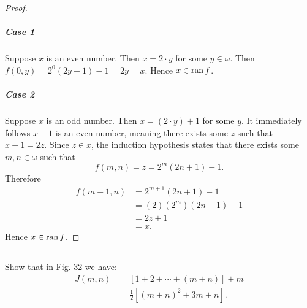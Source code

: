 \documentclass{report}
\begin{document}
\begin{proof}
      \subparagraph{Case 1}%

        Suppose $x$ is an even number.
        Then $x = 2 \cdot y$ for some $y \in \omega$.
        Then $f(0, y) = 2^0(2y + 1) - 1 = 2y = x$.
        Hence $x \in \mathop{\text{ran}}{f}$.

      \subparagraph{Case 2}%

        Suppose $x$ is an odd number.
        Then $x = (2 \cdot y) + 1$ for some $y$.
        It immediately follows $x - 1$ is an even number, meaning there exists
          some $z$ such that $x - 1 = 2z$.
        Since $z \in x$, the induction hypothesis states that there exists
          some $m, n \in \omega$ such that $$f(m, n) = z = 2^m(2n + 1) - 1.$$
        Therefore
          \begin{align*}
            f(m + 1, n)
              & = 2^{m+1}(2n + 1) - 1 \\
              & = (2)(2^m)(2n + 1) - 1 \\
              & = 2z + 1 \\
              & = x.
          \end{align*}
        Hence $x \in \mathop{\text{ran}}{f}$.

  \end{proof}

\subsection{}%

  Show that in Fig. 32 we have:
    \begin{align*}
      J(m, n)
        & = [1 + 2 + \cdots + (m + n)] + m \\
        & = \frac{1}{2}[(m + n)^2 + 3m + n].
    \end{align*}
\end{document}
